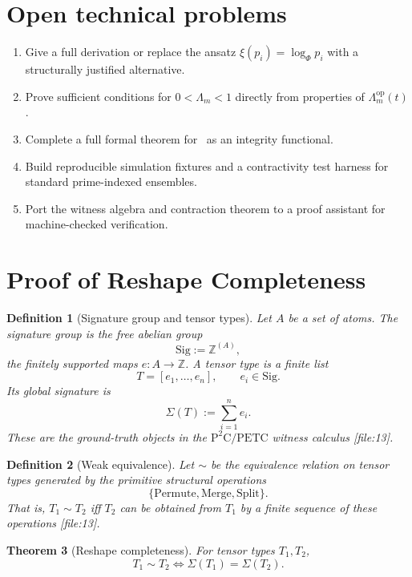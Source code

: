\documentclass[11pt,a4paper]{article}
\newtheorem{theorem}{Theorem}[section]
\newtheorem{definition}[theorem]{Definition}
\newcommand{\Sig}{\mathrm{Sig}}
\newcommand{\op}{\mathrm{op}}
\newcommand{\PWEH}{\mathrm{PWEH}}
\begin{document}
\section{Open technical problems}

\begin{enumerate}[leftmargin=2em]
\item Give a full derivation or replace the ansatz \(\xi(p_i)=\log_\Phi p_i\) with a structurally justified alternative.
\item Prove sufficient conditions for \(0<\Lambda_m<1\) directly from properties of \(\Lambda_m^{\op}(t)\).
\item Complete a full formal theorem for \PWEH\ as an integrity functional.
\item Build reproducible simulation fixtures and a contractivity test harness for standard prime-indexed ensembles.
\item Port the witness algebra and contraction theorem to a proof assistant for machine-checked verification.
\end{enumerate}
\newpage
\section{Proof of Reshape Completeness}

\begin{definition}[Signature group and tensor types]
Let \(A\) be a set of atoms. The signature group is the free abelian group
\[
\Sig := \mathbb{Z}^{(A)},
\]
the finitely supported maps \(e : A \to \mathbb{Z}\). A tensor type is a finite list
\[
T = [e_1,\dots,e_n], \qquad e_i \in \Sig.
\]
Its global signature is
\[
\Sigma(T) := \sum_{i=1}^n e_i.
\]
These are the ground-truth objects in the \(\mathrm{P}^2\mathrm{C}/\mathrm{PETC}\) witness calculus [file:13].
\end{definition}

\begin{definition}[Weak equivalence]
Let \(\sim\) be the equivalence relation on tensor types generated by the primitive structural operations
\[
\{\mathrm{Permute},\mathrm{Merge},\mathrm{Split}\}.
\]
That is, \(T_1 \sim T_2\) iff \(T_2\) can be obtained from \(T_1\) by a finite sequence of these operations [file:13].
\end{definition}

\begin{theorem}[Reshape completeness]
For tensor types \(T_1,T_2\),
\[
T_1 \sim T_2 \iff \Sigma(T_1)=\Sigma(T_2).
\]
\end{theorem}
\end{document}
